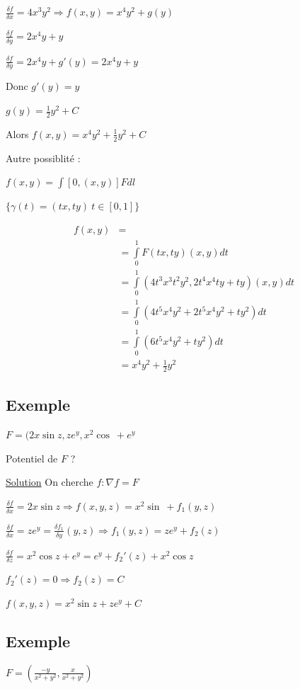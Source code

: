\documentclass[11pt]{article}
\begin{document}
\(\frac{\delta f}{\delta x} = 4x^3y^2 \Rightarrow f(x,y)=x^4y^2 + g(y)\)

\(\frac{\delta f}{\delta y} = 2x^4y+y\)

\(\frac{\delta f}{\delta y} = 2 x^4 y + g'(y) = 2x^4 y + y\)

Donc \(g'(y) = y\)

\(g(y) = \frac{1}{2} y^2 + C\)

Alors \(f(x,y) = x^4y^2 + \frac{1}{2}y^2 + C\)

Autre possiblité :

\(f(x,y) = \int\limits{[0,(x,y)]} F dl\)

\(\lbrace \gamma(t) = (tx,ty)\ t \in [0,1] \rbrace\) 

\begin{align*}
f(x,y) &=\\
&= \int\limits_0^1 F(tx,ty) (x,y) dt\\
&= \int\limits_0^1 (4t^3x^3t^2y^2,2t^4x^4ty+ty) (x,y) dt\\
&= \int\limits_0^1(4t^5x^4y^2+2t^5x^4y^2+ty^2) dt\\
&= \int\limits_0^1(6t^5x^4y^2+ty^2) dt\\
&= x^4y^2 + \frac{1}{2}y^2
\end{align*}

\subsection{Exemple}
\label{sec:orgheadline39}
\(F=(2x\sin z, z e^y, x^2 \cos \ + e^y\)

Potentiel de \(F\) ?

\uline{Solution} On cherche \(f : \nabla f = F\)

\(\frac{\delta f}{\delta x} = 2 x \sin z \Rightarrow f(x,y,z) = x^2 \sin \ + f_1(y,z)\)

\(\frac{\delta f}{\delta x} = z e^y = \frac{\delta f_1}{\delta y} (y,z)
\Rightarrow f_1(y,z) = z e^y + f_2(z)\)

\(\frac{\delta f}{\delta z} = x^2 \cos z + e^y = e^y + f_2'(z) + x^2 \cos z\)

\(f_2'(z) = 0 \Rightarrow f_2(z) = C\)

\(f(x,y,z) = x^2 \sin z + z e^y + C\)

\subsection{Exemple}
\label{sec:orgheadline40}
\(F=\left( \frac{-y}{x^2+y^2},\frac{x}{x^2+y^2}\right)\)
\end{document}
